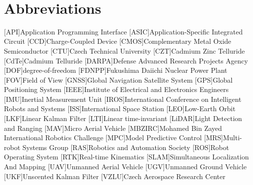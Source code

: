 \documentclass[a4paper,11pt,twoside,openright]{book}
\newcommand{\conditionalClearPage}{
  \ifdefined\printversion
    \cleardoublepage
  \else
    \clearpage
  \fi
}
\begin{document}


\pagestyle{plain}

\conditionalClearPage



\conditionalClearPage


\conditionalClearPage


\conditionalClearPage


\conditionalClearPage

\begin{changemargin}{0.8cm}{0.8cm}

~\vfill{}

\section*{Abbreviations}
\begin{acronym}[MBZIRCC]
  [API]{Application Programming Interface}
  [ASIC]{Application-Specific Integrated Circuit}
  [CCD]{Charge-Coupled Device}
  [CMOS]{Complementary Metal Oxide Semiconductor}
  [CTU]{Czech Technical University}
  [CZT]{Cadmium Zinc Telluride}
  [CdTe]{Cadmium Telluride}
  [DARPA]{Defense Advanced Research Projects Agency}
  [DOF]{degree-of-freedom}
  [FDNPP]{Fukushima Daiichi Nuclear Power Plant}
  [FOV]{Field of View}
  [GNSS]{Global Navigation Satellite System}
  [GPS]{Global Positioning System}
  [IEEE]{Institute of Electrical and Electronics Engineers}
  [IMU]{Inertial Measurement Unit}
  [IROS]{International Conference on Intelligent Robots and Systems}
  [ISS]{International Space Station}
  [LEO]{Low-Earth Orbit}
  [LKF]{Linear Kalman Filter}
  [LTI]{Linear time-invariant}
  [LiDAR]{Light Detection and Ranging}
  [MAV]{Micro Aerial Vehicle}
  [MBZIRC]{Mohamed Bin Zayed International Robotics Challenge}
  [MPC]{Model Predictive Control}
  [MRS]{Multi-robot Systems Group}
  [RAS]{Robotics and Automation Society}
  [ROS]{Robot Operating System}
  [RTK]{Real-time Kinematics}
  [SLAM]{Simultaneous Localization And Mapping}
  [UAV]{Unmanned Aerial Vehicle}
  [UGV]{Unmanned Ground Vehicle}
  [UKF]{Unscented Kalman Filter}
  [VZLU]{Czech Aerospace Research Center}
\end{acronym}

\vskip 2.5cm

\end{changemargin}
\end{document}
